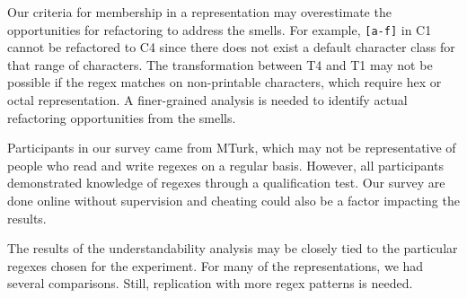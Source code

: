 
Our criteria for membership in a representation may overestimate the opportunities for refactoring to address the smells. For example, \verb![a-f]! in C1 cannot be refactored to C4 since there does not exist a default character class for that range of characters. The transformation between T4 and T1 may not be possible if the regex matches on non-printable characters, which require hex or octal representation. A finer-grained analysis is needed to identify actual refactoring opportunities from the smells.

Participants in our survey came from MTurk, which may not be representative of people who read and write regexes on a regular basis. However, all participants demonstrated knowledge of regexes through a qualification test. Our survey are done online without supervision and cheating could also be a factor impacting the results.


The results of the understandability analysis may be closely tied to the particular regexes chosen for the experiment. For many of the representations, we had several comparisons. Still, replication with more regex patterns is needed.%




